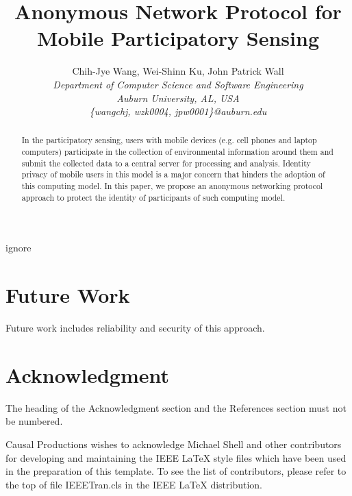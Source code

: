 \documentclass[10pt,conference,letterpaper]{IEEEtran}
\title{Anonymous Network Protocol for Mobile Participatory Sensing}
\author{
Chih-Jye Wang, Wei-Shinn Ku, John Patrick Wall
\vspace{1.6mm}\\
\fontsize{10}{10}\selectfont\itshape
Department of Computer Science and Software Engineering\\
Auburn University, AL, USA\\
\fontsize{9}{9}\selectfont\ttfamily\upshape
\{wangchj, wzk0004, jpw0001\}@auburn.edu\\
}
\begin{document}
\maketitle

\begin{abstract}
In the participatory sensing, users with mobile devices (e.g. cell phones
and laptop computers) participate in the collection of environmental
information around them and submit the collected data to a central server
for processing and analysis. Identity privacy of mobile users in this model
is a major concern that hinders the adoption of this computing model. In
this paper, we propose an anonymous networking protocol approach to protect
the identity of participants of such computing model.
\end{abstract}

\begin{keywords}
ignore
\end{keywords}
%







%

\section{Future Work}
Future work includes reliability and security of this approach.


%



\section*{Acknowledgment}

The heading of the Acknowledgment section and the References section
must not be numbered.

Causal Productions wishes to acknowledge Michael Shell and other
contributors for developing and maintaining the IEEE LaTeX style files
which have been used in the preparation of this template.  To see the
list of contributors, please refer to the top of file IEEETran.cls in
the IEEE LaTeX distribution.



\end{document}
